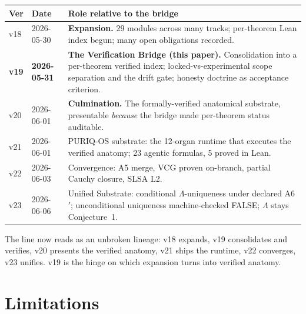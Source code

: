 \documentclass[11pt]{article}
\theoremstyle{plain}
\theoremstyle{definition}
\theoremstyle{remark}
\newcommand{\La}{\Lambda}
\begin{document}
\begin{longtable}{@{}p{}p{}p{}@{}}
\toprule
\textbf{Ver} & \textbf{Date} & \textbf{Role relative to the bridge} \\
\midrule
\endhead
v18 & 2026-05-30 & \textbf{Expansion.} 29 modules across many tracks; per-theorem Lean index begun; many open obligations recorded. \\
\textbf{v19} & \textbf{2026-05-31} & \textbf{The Verification Bridge (this paper).} Consolidation into a per-theorem verified index; locked-vs-experimental scope separation and the drift gate; honesty doctrine as acceptance criterion. \\
v20 & 2026-06-01 & \textbf{Culmination.} The formally-verified anatomical substrate, presentable \emph{because} the bridge made per-theorem status auditable. \\
v21 & 2026-06-01 & PURIQ-OS substrate: the 12-organ runtime that executes the verified anatomy; 23 agentic formulas, 5 proved in Lean. \\
v22 & 2026-06-03 & Convergence: A5 merge, VCG proven on-branch, partial Cauchy closure, SLSA L2. \\
v23 & 2026-06-06 & Unified Substrate: conditional $\La$-uniqueness under declared A6$'$; unconditional uniqueness machine-checked FALSE; $\La$ stays Conjecture~1. \\
\bottomrule
\end{longtable}

\noindent The line now reads as an unbroken lineage: v18 expands, v19 consolidates and
verifies, v20 presents the verified anatomy, v21 ships the runtime, v22 converges, v23
unifies. v19 is the hinge on which expansion turns into verified anatomy.

\section{Limitations}
\label{sec:limits}
\end{document}
